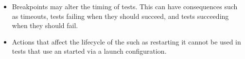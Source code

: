 \begin{itemize}
\item{Breakpoints may alter the timing of tests. This can have consequences 
      such as timeouts, tests failing when they should succeed, and tests 
      succeeding when they should fail.}
\item Actions that affect the lifecycle of the \gdaut{} such as restarting it cannot be used in tests that use an \gdaut{} started via a launch configuration.
\end{itemize}
